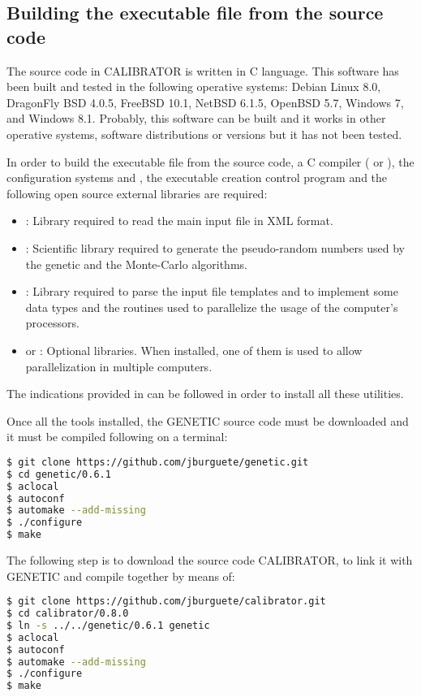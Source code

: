 \documentclass[review,authoryear]{elsarticle}
\begin{document}
\subsection{Building the executable file from the source code}

The source code in CALIBRATOR is written in C language. This software has
been built and tested in the following operative systems:
Debian Linux 8.0,
DragonFly BSD 4.0.5,
FreeBSD 10.1,
NetBSD 6.1.5,
OpenBSD 5.7,
Windows 7\footnotemark[1],
and Windows 8.1\footnotemark[1].
Probably, this software can be built and it works in other operative systems,
software distributions or versions but it has not been tested.

In order to build the executable file from the source code, a C compiler (\citet{gcc} or \citet{clang}), the configuration systems \citet{autoconf} and \citet{automake}, the executable creation control program \citet{gnumake} and the following open source external libraries are required:
\begin{itemize}
\item\citet{libxml}: Library required to read the main input file in XML format.
\item\citet{gsl}: Scientific library required to generate the pseudo-random numbers used by the genetic and the Monte-Carlo algorithms.
\item\citet{glib}: Library required to parse the input file templates and to implement some data types and the routines used to parallelize the usage of the computer's processors.
\item\citet{openmpi} or \citet{mpich}: Optional libraries. When installed, one
of them is used to allow parallelization in multiple computers.
\end{itemize}
The indications provided in \citet{install-unix} can be followed in order to install all these utilities.

Once all the tools installed, the GENETIC source code must be downloaded and it must be compiled following on a terminal:
\begin{lstlisting}[language=bash,basicstyle=\scriptsize]
$ git clone https://github.com/jburguete/genetic.git
$ cd genetic/0.6.1
$ aclocal
$ autoconf
$ automake --add-missing
$ ./configure
$ make
\end{lstlisting}

The following step is to download the source code CALIBRATOR, to link it with GENETIC and compile together by means of:
\begin{lstlisting}[language=bash,basicstyle=\scriptsize]
$ git clone https://github.com/jburguete/calibrator.git
$ cd calibrator/0.8.0
$ ln -s ../../genetic/0.6.1 genetic
$ aclocal
$ autoconf
$ automake --add-missing
$ ./configure
$ make
\end{lstlisting}
\end{document}
